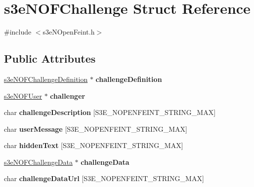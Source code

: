 \hypertarget{structs3e_n_o_f_challenge}{
\section{s3eNOFChallenge Struct Reference}
\label{structs3e_n_o_f_challenge}
}


{\ttfamily \#include $<$s3eNOpenFeint.h$>$}

\subsection*{Public Attributes}
\begin{DoxyCompactItemize}
\item 
\hypertarget{structs3e_n_o_f_challenge_aa658e67f428c8e785a8c7e6caa8e4949}{
\hyperlink{structs3e_n_o_f_challenge_definition}{s3eNOFChallengeDefinition} $\ast$ {\bfseries challengeDefinition}}
\label{structs3e_n_o_f_challenge_aa658e67f428c8e785a8c7e6caa8e4949}

\item 
\hypertarget{group___n_open_feint_api_group_ga1c8dbfd19cf4b9f8ec94350247bcdcb7}{
\hyperlink{structs3e_n_o_f_user}{s3eNOFUser} $\ast$ {\bfseries challenger}}
\label{group___n_open_feint_api_group_ga1c8dbfd19cf4b9f8ec94350247bcdcb7}

\item 
\hypertarget{group___n_open_feint_api_group_ga26fc42a6ce20db337578eaecf96f0914}{
char {\bfseries challengeDescription} \mbox{[}S3E\_\-NOPENFEINT\_\-STRING\_\-MAX\mbox{]}}
\label{group___n_open_feint_api_group_ga26fc42a6ce20db337578eaecf96f0914}

\item 
\hypertarget{group___n_open_feint_api_group_ga39c79347e6372fce8673936899cfcda1}{
char {\bfseries userMessage} \mbox{[}S3E\_\-NOPENFEINT\_\-STRING\_\-MAX\mbox{]}}
\label{group___n_open_feint_api_group_ga39c79347e6372fce8673936899cfcda1}

\item 
\hypertarget{group___n_open_feint_api_group_gaf63ff301a7be88e3180d1a152c376ac7}{
char {\bfseries hiddenText} \mbox{[}S3E\_\-NOPENFEINT\_\-STRING\_\-MAX\mbox{]}}
\label{group___n_open_feint_api_group_gaf63ff301a7be88e3180d1a152c376ac7}

\item 
\hypertarget{group___n_open_feint_api_group_gaec7022a723b75796a1c028d9e1df1034}{
\hyperlink{structs3e_n_o_f_challenge_data}{s3eNOFChallengeData} $\ast$ {\bfseries challengeData}}
\label{group___n_open_feint_api_group_gaec7022a723b75796a1c028d9e1df1034}

\item 
\hypertarget{group___n_open_feint_api_group_ga47456af3464434e78f5719f7c05e0985}{
char {\bfseries challengeDataUrl} \mbox{[}S3E\_\-NOPENFEINT\_\-STRING\_\-MAX\mbox{]}}
\label{group___n_open_feint_api_group_ga47456af3464434e78f5719f7c05e0985}

\end{DoxyCompactItemize}


